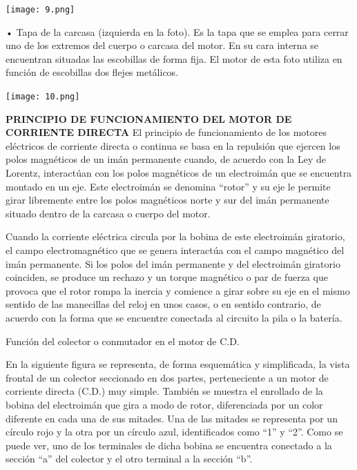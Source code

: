 \documentclass[10pt,a4paper]{article}
\begin{document}
\begin{center}
\texttt{[image: 9.png]} 
\end{center}

• Tapa de la carcasa (izquierda en la foto). Es la tapa que se emplea para cerrar uno de los extremos del cuerpo o carcasa del motor. En su cara interna se encuentran situadas las escobillas de forma fija. El motor de esta foto utiliza en función de escobillas dos flejes metálicos.\\

\begin{center}
\texttt{[image: 10.png]} 
\end{center}

\textbf{PRINCIPIO DE FUNCIONAMIENTO DEL MOTOR DE CORRIENTE DIRECTA}
El principio de funcionamiento de los motores eléctricos de corriente directa o continua se basa en la repulsión que ejercen los polos magnéticos de un imán permanente cuando, de acuerdo con la Ley de Lorentz, interactúan con los polos magnéticos de un electroimán que se encuentra montado en un eje. Este electroimán se denomina “rotor” y su eje le permite girar libremente entre los polos magnéticos norte y sur del imán permanente situado dentro de la carcasa o cuerpo del motor.

Cuando la corriente eléctrica circula por la bobina de este electroimán giratorio, el campo electromagnético que se genera interactúa con el campo magnético del imán permanente. Si los polos del imán permanente y del electroimán giratorio coinciden, se produce un rechazo y un torque magnético o par de fuerza que provoca que el rotor rompa la inercia y comience a girar sobre su eje en el mismo sentido de las manecillas del reloj en unos casos, o en sentido contrario, de acuerdo con la forma que se encuentre conectada al circuito la pila o la batería.


Función del colector o conmutador en el motor de C.D.

En la siguiente figura se representa, de forma esquemática y simplificada, la vista frontal de un colector seccionado en dos partes, perteneciente a un motor de corriente directa (C.D.) muy simple. También se muestra el enrollado de la bobina del electroimán que gira a modo de rotor, diferenciada por un color diferente en cada una de sus mitades. Una de las mitades se representa por un círculo rojo y la otra por un círculo azul, identificados como “1” y “2”. Como se puede ver, uno de los terminales de dicha bobina se encuentra conectado a la sección “a” del colector y el otro terminal a la sección “b”.\\
\end{document}
